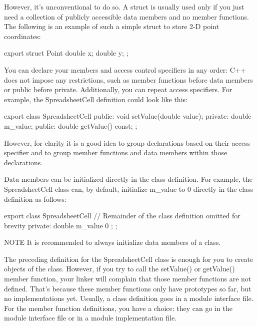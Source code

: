 However, it’s unconventional to do so. A struct is usually used only if you just need a collection of publicly accessible data members and no member functions. The following is an example of such a simple struct to store 2-D point coordinates:

\begin{cpp}
export struct Point
{
    double x;
    double y;
};
\end{cpp}


You can declare your members and access control specifiers in any order: C++ does not impose any restrictions, such as member functions before data members or public before private. Additionally, you can repeat access specifiers. For example, the SpreadsheetCell definition could look like this:

\begin{cpp}
export class SpreadsheetCell
{
    public:
        void setValue(double value);
    private:
        double m_value;
    public:
        double getValue() const;
};
\end{cpp}

However, for clarity it is a good idea to group declarations based on their access specifier and to group member functions and data members within those declarations.



Data members can be initialized directly in the class definition. For example, the SpreadsheetCell class can, by default, initialize m\_value to 0 directly in the class definition as follows:

\begin{cpp}
export class SpreadsheetCell
{
    // Remainder of the class definition omitted for brevity
    private:
        double m_value { 0 };
};
\end{cpp}

\begin{myNotic}{NOTE}
It is recommended to always initialize data members of a class.
\end{myNotic}


The preceding definition for the SpreadsheetCell class is enough for you to create objects of the class. However, if you try to call the setValue() or getValue() member function, your linker will complain that those member functions are not defined. That’s because these member functions only have prototypes so far, but no implementations yet. Usually, a class definition goes in a module interface file. For the member function definitions, you have a choice: they can go in the module interface file or in a module implementation file.

